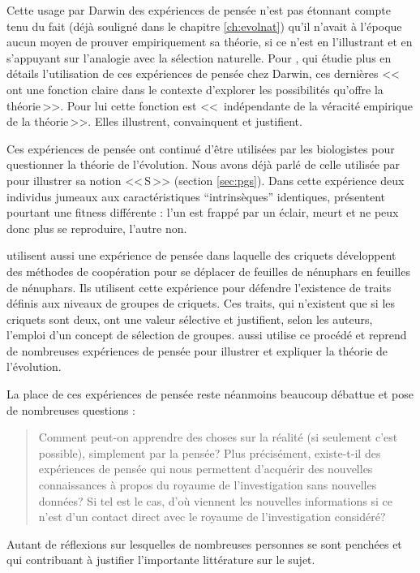 Cette usage par Darwin des expériences de pensée n'est pas étonnant compte tenu du fait (déjà souligné dans le chapitre \ref{ch:evolnat}) qu'il n'avait à l'époque aucun moyen de prouver empiriquement sa théorie, si ce n'est en l'illustrant et en s'appuyant sur l'analogie avec la sélection naturelle. Pour \cite{lennox91darwinianthoughtexperimentsafunctionforjustsostories}, qui étudie plus en détails l'utilisation de ces expériences de pensée chez Darwin, ces dernières <<\,ont une fonction claire dans le contexte d'explorer les possibilités qu'offre la théorie\,>>. Pour lui cette fonction est <<\, indépendante de la véracité empirique de la théorie\,>>. Elles illustrent, convainquent et justifient.

Ces expériences de pensée ont continué d'être utilisées par les biologistes pour questionner la théorie de l'évolution. Nous avons déjà parlé de celle utilisée par \cite{godfrey2009darwinian} pour illustrer sa notion <<\,S\,>>  (section \ref{sec:pgs}). Dans cette expérience deux individus jumeaux aux caractéristiques ``intrinsèques'' identiques, présentent pourtant une fitness différente : l'un est frappé par un éclair, meurt et ne peux donc plus se reproduire, l'autre non.

\cite{wilson1994reintroducinggroupselectiontothehumanbehavioralsciences} utilisent aussi une expérience de pensée dans laquelle des criquets développent des méthodes de coopération pour se déplacer de feuilles de nénuphars en feuilles de nénuphars. Ils utilisent cette expérience pour défendre l'existence de traits définis aux niveaux de groupes de criquets. Ces traits, qui n'existent que si les criquets sont deux, ont une valeur sélective et justifient, selon les auteurs, l'emploi d'un concept de sélection de groupes. \cite{dennett95darwinsdangerousideaevolutionmeaningslife} aussi utilise ce procédé et reprend de nombreuses expériences de pensée pour illustrer et expliquer la théorie de l'évolution.

La place de ces expériences de pensée reste néanmoins beaucoup débattue et pose de nombreuses questions :
\begin{quotation}
	Comment peut-on apprendre des choses sur la réalité (si seulement c'est possible), simplement par la pensée? Plus précisément, existe-t-il des expériences de pensée qui nous permettent d'acquérir des nouvelles connaissances à propos du royaume de l'investigation sans nouvelles données? Si tel est le cas, d'où viennent les nouvelles informations si ce n'est d'un contact direct avec le royaume de l'investigation considéré?\\
\citep{brown2011thoughtexperiments}
\end{quotation}
Autant de réflexions sur lesquelles de nombreuses personnes se sont penchées et qui contribuant à justifier l'importante littérature sur le sujet. 

